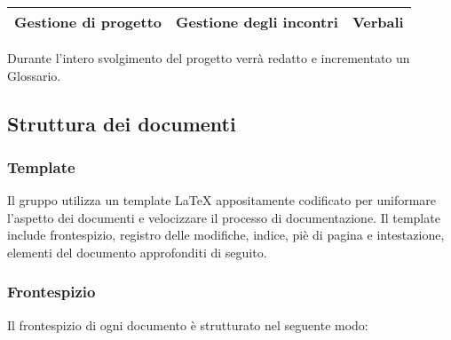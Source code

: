 \documentclass[../NormediProgetto.tex]{subfiles}
\begin{document}
\begin{longtable}{| p{4cm} |p{5cm} | p{4cm} |}
	\hline
	
	\newline Gestione di progetto &
	\newline Gestione degli incontri &
	\newline Verbali \newline 
	\\[1em]
	
	\hline
\end{longtable}

\noindent Durante l'intero svolgimento del progetto verrà redatto e incrementato un Glossario.


\subsection{Struttura dei documenti}

\subsubsection{Template}

Il gruppo utilizza un template \LaTeX{} appositamente codificato per uniformare l'aspetto dei documenti e velocizzare il processo di documentazione. Il template include frontespizio, registro delle modifiche, indice, piè di pagina e intestazione, elementi del documento approfonditi di seguito. 

\subsubsection{Frontespizio}

Il frontespizio di ogni documento è strutturato nel seguente modo:
\end{document}
